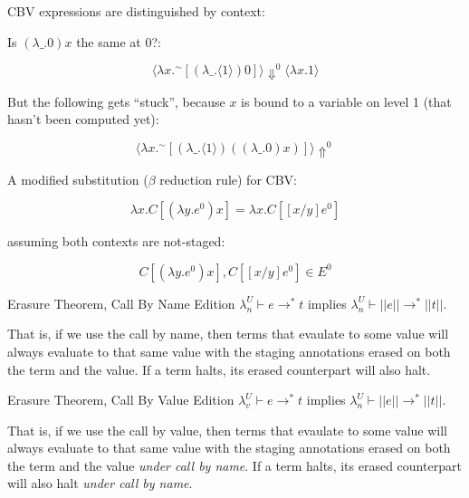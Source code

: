 \documentclass{beamer}
\begin{document}
\begin{frame}{CBV expressions are distinguished by context:}

Is $(\lambda\_.0) x$ the same at $0$?:

\begin{equation*}
\langle \lambda x.^\sim [(\lambda\_.\langle 1 \rangle) 0] \rangle
\Downarrow^0 \langle \lambda x.1 \rangle
\end{equation*}


But the following gets ``stuck'', because $x$ is bound to a variable
on level 1 (that hasn't been computed yet):

\begin{equation*}
\langle \lambda x.^\sim [(\lambda\_.\langle 1 \rangle)
 ((\lambda\_.0) 
 x)] \rangle \Uparrow^0
\end{equation*}

\end{frame}

\begin{frame}

A modified substitution ($\beta$ reduction rule) for CBV:

\begin{equation*}
\lambda x.C[(\lambda y.e^0) x] = \lambda x.C[[x/y]e^0]
\end{equation*}

assuming both contexts are not-staged:

\begin{equation*}
C[(\lambda y.e^0) x], C[[x/y]e^0]  \in E^0
\end{equation*}

\end{frame}


\begin{frame}{Erasure Theorem, Call By Name Edition}
$\lambda _n ^U \vdash e \rightarrow ^* t$ implies $\lambda _n ^U \vdash ||e|| \rightarrow ^* ||t||$.\\
\vspace{1cm} 

That is, if we use the call by name, then terms that evaulate to some
value will always evaluate to that same value with the staging
annotations erased on both the term and the value. If a term halts,
its erased counterpart will also halt.
\end{frame}

\begin{frame}{Erasure Theorem, Call By Value Edition}
$\lambda _v ^U \vdash e \rightarrow ^* t$ implies $\lambda _n ^U \vdash ||e|| \rightarrow ^* ||t||$.\\
\vspace{1cm}

That is, if we use the call by value, then terms that evaulate to some
value will always evaluate to that same value with the staging
annotations erased on both the term and the value \textit{under call
  by name}. If a term halts, its erased counterpart will also halt
\textit{under call by name}.
\end{frame}
\end{document}
